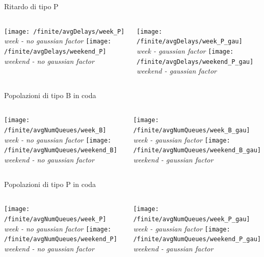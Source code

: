 \documentclass[xcolor=table]{beamer}
\begin{document}
\begin{frame}{Ritardo di tipo P}
\begin{columns}
\centering
\texttt{[image: /finite/avgDelays/week\_P]}\\
\textit{week - no gaussian factor}
\texttt{[image: /finite/avgDelays/weekend\_P]}\\
\textit{weekend - no gaussian factor}

\centering
\texttt{[image: /finite/avgDelays/week\_P\_gau]}\\
\textit{week - gaussian factor}
\texttt{[image: /finite/avgDelays/weekend\_P\_gau]}\\
\textit{weekend - gaussian factor}
\end{columns}
\end{frame}


\begin{frame}{Popolazioni di tipo B in coda}
\begin{columns}
\centering
\texttt{[image: /finite/avgNumQueues/week\_B]}\\
\textit{week - no gaussian factor}
\texttt{[image: /finite/avgNumQueues/weekend\_B]}\\
\textit{weekend - no gaussian factor}

\centering
\texttt{[image: /finite/avgNumQueues/week\_B\_gau]}\\
\textit{week - gaussian factor}
\texttt{[image: /finite/avgNumQueues/weekend\_B\_gau]}\\
\textit{weekend - gaussian factor}
\end{columns}
\end{frame}

\begin{frame}{Popolazioni di tipo P in coda}
\begin{columns}
\centering
\texttt{[image: /finite/avgNumQueues/week\_P]}\\
\textit{week - no gaussian factor}
\texttt{[image: /finite/avgNumQueues/weekend\_P]}\\
\textit{weekend - no gaussian factor}

\centering
\texttt{[image: /finite/avgNumQueues/week\_P\_gau]}\\
\textit{week - gaussian factor}
\texttt{[image: /finite/avgNumQueues/weekend\_P\_gau]}\\
\textit{weekend - gaussian factor}
\end{columns}
\end{frame}
\end{document}
